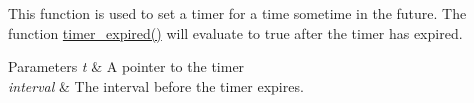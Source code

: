 This function is used to set a timer for a time sometime in the future. The function \hyperlink{group__timer_ga6d71dececfce707c668e6257aad5906e}{timer\-\_\-expired()} will evaluate to true after the timer has expired.


\begin{DoxyParams}{Parameters}
{\em t} & A pointer to the timer \\
\hline
{\em interval} & The interval before the timer expires. \\
\hline
\end{DoxyParams}
